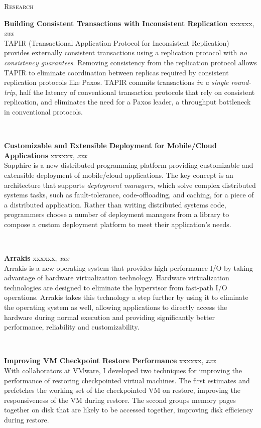 \documentclass[10pt,times]{report}
\newlength{\sectiongap}
\newlength{\entrygap}
\newlength{\sectioncolwidth}
\newlength{\colgap}
\newlength{\stuffwidth}
\def\ifEqString#1#2{\def\testa{#1}\def\testb{#2}%
  \ifx\testa\testb}
\newenvironment{rtable}{
  \begin{minipage}{\textwidth}
  }{
  \end{minipage}
}
\newenvironment{rentry}[3][xxx]{
  \begin{minipage}[t]{\hsize}
    \textbf{#2}\ifEqString{#1}{xxx}\relax\else, \textit{#1}\fi
    \hspace{\stretch{1}} #3 \\
  }{
    \removelastskip
  \end{minipage}
  \\[\entrygap]  %
}
\newenvironment{rsection}[1]{
  \begin{minipage}[t]{\sectioncolwidth}
    \textsc{#1}
  \end{minipage}
  \hspace{\colgap}
  \begin{minipage}[t]{\stuffwidth}
  }{
    \removelastskip
  \end{minipage}
  \\[\sectiongap]
}
\begin{document}
\begin{rtable}
  \begin{rsection}{Research}
    \begin{rentry}{Building Consistent Transactions with Inconsistent
        Replication}{}
      TAPIR (Transactional Application Protocol for Inconsistent
      Replication) provides externally consistent transactions using a
      replication protocol with \emph{no consistency guarantees}.
      Removing consistency from the replication protocol allows TAPIR
      to eliminate coordination between replicas required by
      consistent replication protocols like Paxos. TAPIR commits
      transactions \emph{in a single round-trip}, half the latency of
      conventional transaction protocols that rely on consistent
      replication, and eliminates the need for a Paxos leader, a
      throughput bottleneck in conventional protocols.
    \end{rentry}

    \begin{rentry}{Customizable and Extensible Deployment for
        Mobile/Cloud Applications}{}
      Sapphire is a new distributed programming platform providing
      customizable and extensible deployment of mobile/cloud
      applications. The key concept is an architecture that supports
      \emph{deployment managers}, which solve complex distributed
      systems tasks, such as fault-tolerance, code-offloading, and
      caching, for a piece of a distributed application. Rather than
      writing distributed systems code, programmers choose a number of
      deployment managers from a library to compose a custom
      deployment platform to meet their application's needs.
    \end{rentry}

    \begin{rentry}{Arrakis}{}
      Arrakis is a new operating system that provides high performance
      I/O by taking advantage of hardware virtualization
      technology. Hardware virtualization technologies are designed to
      eliminate the hypervisor from fast-path I/O operations. Arrakis
      takes this technology a step further by using it to eliminate
      the operating system as well, allowing applications to directly
      access the hardware during normal execution and providing
      significantly better performance, reliability and
      customizability.
    \end{rentry}

    \begin{rentry}{Improving VM Checkpoint Restore Performance}{} 
      With collaborators at VMware, I developed two techniques for
      improving the performance of restoring checkpointed virtual
      machines. The first estimates and prefetches the working set of
      the checkpointed VM on restore, improving the responsiveness of
      the VM during restore. The second groups memory pages together
      on disk that are likely to be accessed together, improving disk
      efficiency during restore.
    \end{rentry}


\end{rsection}
\end{rtable}
\end{document}
